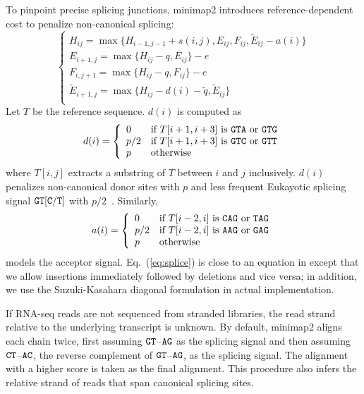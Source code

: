 \documentclass{bioinfo}
\begin{document}
\begin{methods}
To pinpoint precise splicing junctions, minimap2 introduces reference-dependent
cost to penalize non-canonical splicing:
\begin{equation}\label{eq:splice}
\left\{\begin{array}{l}
H_{ij} = \max\{H_{i-1,j-1}+s(i,j),E_{ij},F_{ij},\tilde{E}_{ij}-a(i)\}\\
E_{i+1,j}= \max\{H_{ij}-q,E_{ij}\}-e\\
F_{i,j+1}= \max\{H_{ij}-q,F_{ij}\}-e\\
\tilde{E}_{i+1,j}= \max\{H_{ij}-d(i)-\tilde{q},\tilde{E}_{ij}\}\\
\end{array}\right.
\end{equation}
Let $T$ be the reference sequence. $d(i)$ is computed as
\[d(i)=\left\{\begin{array}{ll}
0 & \mbox{if $T[i+1,i+3]$ is ${\tt GTA}$ or ${\tt GTG}$} \\
p/2 & \mbox{if $T[i+1,i+3]$ is ${\tt GTC}$ or ${\tt GTT}$} \\
p & \mbox{otherwise}
\end{array}\right.\]
where $T[i,j]$ extracts a substring of $T$ between $i$ and $j$ inclusively.
$d(i)$ penalizes non-canonical donor sites with $p$ and less frequent Eukayotic
splicing signal ${\tt GT[C/T]}$ with $p/2$~\citep{Irimia:2008aa}. Similarly,
\[a(i)=\left\{\begin{array}{ll}
0 & \mbox{if $T[i-2,i]$ is ${\tt CAG}$ or ${\tt TAG}$} \\
p/2 & \mbox{if $T[i-2,i]$ is ${\tt AAG}$ or ${\tt GAG}$} \\
p & \mbox{otherwise}
\end{array}\right.\]
models the acceptor signal. Eq.~(\ref{eq:splice}) is close to an equation in
\citet{Zhang:2006aa} except that we allow insertions immediately followed by
deletions and vice versa; in addition, we use the Suzuki-Kasahara diagonal
formulation in actual implementation.

If RNA-seq reads are not sequenced from stranded libraries, the read strand
relative to the underlying transcript is unknown. By default, minimap2 aligns
each chain twice, first assuming ${\tt GT}$--${\tt AG}$ as the splicing signal
and then assuming ${\tt CT}$--${\tt AC}$, the reverse complement of ${\tt
GT}$--${\tt AG}$, as the splicing signal. The alignment with a higher score is
taken as the final alignment. This procedure also infers the relative strand of
reads that span canonical splicing sites.


\end{methods}
\end{document}
